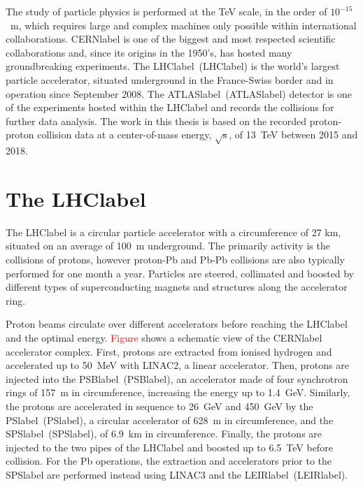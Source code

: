 The study of particle physics is performed at the TeV scale, in the order of $10^{-15}$~m, which requires large and complex machines only possible within international collaborations. \acrshort{CERNlabel} is one of the biggest and most respected scientific collaborations and, since its origins in the 1950's, has hosted many groundbreaking experiments. The \acrlong{LHClabel}~(\acrshort{LHClabel}) is the world's largest particle accelerator, situated underground in the France-Swiss border and in operation since September 2008. The \acrlong{ATLASlabel}~(\acrshort{ATLASlabel}) detector is one of the experiments hosted within the \acrshort{LHClabel} and records the collisions for further data analysis. The work in this thesis is based on the recorded proton-proton collision data at a center-of-mass energy, $\sqrt{\text{s}}$, of 13~TeV between 2015 and 2018.
\section{The \acrshort{LHClabel}}

The \acrshort{LHClabel} is a circular particle accelerator with a circumference of 27 km, situated on an average of 100~m underground. The primarily activity is the collisions of protons, however proton-Pb and Pb-Pb collisions are also typically performed for one month a year. Particles are steered, collimated and boosted by different types of superconducting magnets and structures along the accelerator ring.

Proton beams circulate over different accelerators before reaching the \acrshort{LHClabel} and the optimal energy. \textcolor{red}{Figure} shows a schematic view of the \acrshort{CERNlabel} accelerator complex. First, protons are extracted from ionised hydrogen and accelerated up to 50~MeV with LINAC2, a linear accelerator. Then, protons are injected into the \acrlong{PSBlabel}~(\acrshort{PSBlabel}), an accelerator made of four synchrotron rings of 157~m in circumference, increasing the energy up to 1.4~GeV. Similarly, the protons are accelerated in sequence to 26~GeV and 450~GeV by the \acrlong{PSlabel}~(\acrshort{PSlabel}), a circular accelerator of 628~m in circumference, and the \acrlong{SPSlabel}~(\acrshort{SPSlabel}), of 6.9~km in circumference. Finally, the protons are injected to the two pipes of the \acrshort{LHClabel} and boosted up to 6.5~TeV before collision. For the Pb operations, the extraction and accelerators prior to the \acrshort{SPSlabel} are performed instead using LINAC3 and the \acrlong{LEIRlabel}~(\acrshort{LEIRlabel}).

